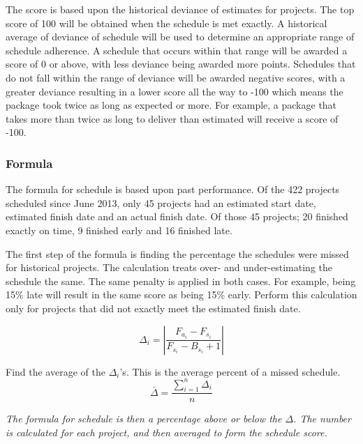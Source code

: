 \documentclass[SDSUThesis.tex]{subfiles}
\begin{document}
        The score is based upon the historical deviance of estimates for
        projects.  The top score of
        100 will be obtained when the schedule is met exactly.  A historical average 
        of deviance of schedule will be used to determine an appropriate range
        of schedule adherence.  A schedule that occurs within that range will be awarded
        a score of 0 or above, with less deviance being awarded more points.  Schedules
        that do not fall within the range of deviance will be awarded negative scores, 
        with a greater deviance resulting in a lower score all the way to -100 which means
        the package took twice as long as expected or more.
        For example, a package that takes more than twice as long to deliver than
        estimated will receive a score of -100.
    
    \subsubsection{Formula}
    
    The formula for schedule is based upon past performance.  Of the 422 projects
    scheduled since June 2013, only 45 projects had an estimated start date, estimated
    finish date and an actual finish date.  Of those 45 projects; 20 finished exactly on time,
    9 finished early and 16 finished late.  
    
    The first step of the formula is finding the percentage the schedules were missed for 
    historical projects.  The calculation treats over- and under-estimating the schedule
    the same.  The same penalty is applied in both cases.  For example, being 15\% late
    will result in the same score as being 15\% early. Perform this calculation
    only for projects that did not exactly meet the estimated finish date.
    
        \begin{displaymath}
            \Delta_i = \left| \frac{F_{a_i} - F_{s_i}}{ F_{s_i} - B_{s_i} + 1} \right|
        \end{displaymath}
        
        Find the average of the $\Delta_i$'s.  This is the average percent of a missed
        schedule.  
        \begin{displaymath}
           \bar{\Delta}  = \frac{\sum^n_{i=1}\Delta_i}{n}
        \end{displaymath}
        
        \textit{The formula for schedule is then a percentage above or below the $\Delta$.  
        The number is calculated for each project, and then averaged to form the schedule score.}
        
\end{document}
